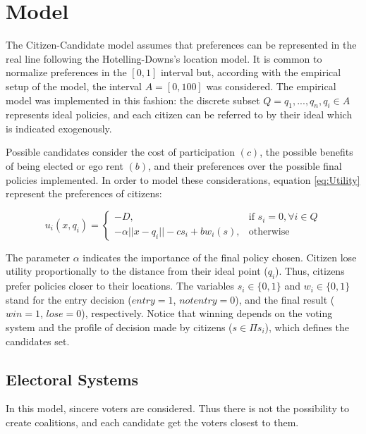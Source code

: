 \section{Model}


The Citizen-Candidate model assumes that preferences can be represented
in the real line following the Hotelling-Downs's location model. It is
common to normalize preferences in the \([0,1]\) interval but, according with the
empirical setup of the model, the interval \(A=[0,100]\) was considered.
The empirical model was implemented in this fashion: the discrete subset
\(Q={q_1, ..., q_n}, q_i \in A\) represents ideal policies, and each
citizen can be referred to by their ideal which is indicated
exogenously.

Possible candidates consider the cost of participation \((c)\), the
possible benefits of being elected or ego rent \((b)\), and their
preferences over the possible final policies implemented. In order to
model these considerations, equation \ref{eq:Utility} represent the preferences of citizens:

\begin{equation}
u_i(x,q_i)=
\begin{cases}
-D, & \text{if } s_i=0, \forall i \in Q \\
-\alpha||x-q_i|| - cs_i + bw_i(s), & \text{otherwise} 
\end{cases}\label{eq:Utility}
\end{equation}

The parameter \(\alpha\) indicates the importance of the final policy
chosen. Citizen lose utility proportionally to the distance from their ideal point (\(q_i\)).
Thus, citizens prefer policies closer to their locations. The variables
\(s_i \in \{0,1\}\) and \(w_i \in \{0,1\}\) stand for the entry decision
(\(entry=1\), $not entry = 0$), and the final result (\(win=1\), $lose=0$), respectively. Notice
that winning depends on the voting system and the profile of decision
made by citizens (\(s \in \Pi s_i\)), which defines the candidates set.

\subsection{Electoral Systems}\label{electoral-systems}

In this model, sincere voters are considered. Thus there is not the possibility to create coalitions, and each candidate get the voters closest to them.  

